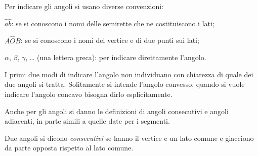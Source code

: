 \begin{minipage}{.69\textwidth}
 Per indicare gli angoli si usano diverse convenzioni:
\begin{itemize*}
\item  \(\widehat{ab}\): se si conoscono i nomi delle semirette che ne 
costituiscono i lati;
\item  \(A\widehat{O}B\): se si conoscono i nomi del vertice e di due 
punti sui lati;
\item  \(\alpha\), \(\beta\), \(\gamma\), \ldots{} (una lettera greca): per 
indicare direttamente l'angolo.
\end{itemize*}
\end{minipage}
\begin{minipage}{.39\textwidth}
 \begin{inaccessibleblock}
 \begin{center} \end{center}
\end{inaccessibleblock}
\end{minipage}

I primi due modi di indicare l'angolo non individuano con chiarezza 
di quale dei due angoli si tratta. Solitamente si intende l'angolo 
convesso, quando si vuole indicare l'angolo concavo bisogna dirlo 
esplicitamente.

Anche per gli angoli si danno le definizioni di angoli consecutivi e 
angoli adiacenti, in parte simili a quelle date per i segmenti.

\begin{definizione}
Due angoli si dicono \emph{consecutivi} se hanno il vertice e un lato 
comune e giacciono da parte opposta rispetto al lato comune.
\end{definizione}


